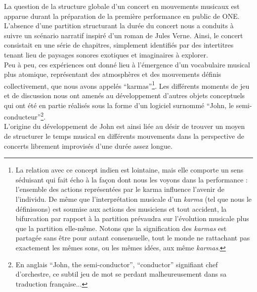 \noindent La question de la structure globale d'un concert en mouvements musicaux est apparue durant la préparation de la première performance en public de ONE. L'absence d'une partition structurant la durée du concert nous a conduits à suivre un scénario narratif inspiré d'un roman de Jules Verne. Ainsi, le concert consistait en une série de chapitres, simplement identifiés par des intertitres tenant lieu de paysages sonores exotiques et imaginaires à explorer.\\
\indent Peu à peu, ces expériences ont donné lieu à l'émergence d'un vocabulaire musical plus atomique, représentant des atmosphères et des mouvements définis collectivement, que nous avons appelés ``karmas''\footnote{La relation avec ce concept indien est lointaine, mais elle comporte un sens séduisant qui fait écho à la façon dont nous les voyons dans la performance : l'ensemble des actions représentées par le karma influence l'avenir de l'individu. De même que l'interprétation musicale d'un \textit{karma} (tel que nous le définissons) est soumise aux actions des musiciens et tout accident, la bifurcation par rapport à la partition prévaudra sur l'évolution musicale plus que la partition elle-même. Notons que la signification des \textit{karmas} est partagée sans être pour autant consensuelle, tout le monde ne rattachant pas exactement les mêmes sons, ou les mêmes idées, aux même \textit{karmas}.}. Les différents moments de jeu et de discussion nous ont amenés au développement d'autres objets conceptuels qui ont été en partie réalisés sous la forme d'un logiciel surnommé ``John, le semi-conducteur''\footnote{En anglais ``John, the semi-conductor'', ``conductor'' signifiant chef d'orchestre, ce subtil jeu de mot se perdant malheureusement dans sa traduction française...}.\\
\indent L'origine du développement de John est ainsi liée au désir de trouver un moyen de structurer le temps musical en différents mouvements dans la perspective de concerts librement improvisés d'une durée assez longue. 

